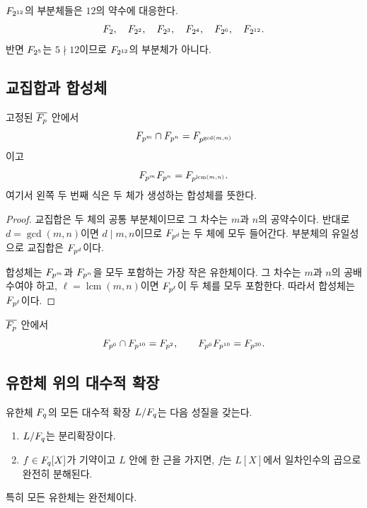 \begin{example}
$F_{2^{12}}$의 부분체들은 $12$의 약수에 대응한다.
\[
  F_2,\quad F_{2^2},\quad F_{2^3},\quad
  F_{2^4},\quad F_{2^6},\quad F_{2^{12}}.
\]
반면 $F_{2^5}$는 $5\nmid12$이므로 $F_{2^{12}}$의 부분체가 아니다.
\end{example}

\subsection{교집합과 합성체}

\begin{corollary}
고정된 $\overline{F_p}$ 안에서
\[
  F_{p^m}\cap F_{p^n}
  =F_{p^{\gcd(m,n)}}
\]
이고
\[
  F_{p^m}F_{p^n}
  =F_{p^{\operatorname{lcm}(m,n)}}.
\]
여기서 왼쪽 두 번째 식은 두 체가 생성하는 합성체를 뜻한다.
\end{corollary}

\begin{proof}
교집합은 두 체의 공통 부분체이므로 그 차수는 $m$과 $n$의 공약수이다. 반대로 $d=\gcd(m,n)$이면 $d\mid m,n$이므로 $F_{p^d}$는 두 체에 모두 들어간다. 부분체의 유일성으로 교집합은 $F_{p^d}$이다.

합성체는 $F_{p^m}$과 $F_{p^n}$을 모두 포함하는 가장 작은 유한체이다. 그 차수는 $m$과 $n$의 공배수여야 하고, $\ell=\operatorname{lcm}(m,n)$이면 $F_{p^\ell}$이 두 체를 모두 포함한다. 따라서 합성체는 $F_{p^\ell}$이다.
\end{proof}

\begin{example}
$\overline{F_p}$ 안에서
\[
  F_{p^6}\cap F_{p^{10}}=F_{p^2},
  \qquad
  F_{p^6}F_{p^{10}}=F_{p^{30}}.
\]
\end{example}

\subsection{유한체 위의 대수적 확장}

\begin{theorem}
유한체 $F_q$의 모든 대수적 확장 $L/F_q$는 다음 성질을 갖는다.
\begin{enumerate}[label=(\roman*)]
  \item $L/F_q$는 분리확장이다.
  \item $f\in F_q[X]$가 기약이고 $L$ 안에 한 근을 가지면, $f$는 $L[X]$에서 일차인수의 곱으로 완전히 분해된다.
\end{enumerate}
특히 모든 유한체는 완전체이다.
\end{theorem}

